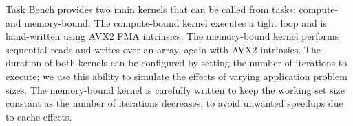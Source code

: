 



Task Bench provides two main kernels that can be called from tasks:
compute- and memory-bound. The compute-bound
kernel executes a tight loop and is hand-written using AVX2 FMA
intrinsics. The memory-bound kernel performs sequential reads and
writes over an array, again with AVX2
intrinsics. The duration of both kernels can be configured by setting
the number of iterations to execute; we use this ability to simulate
the effects of varying application problem sizes. The memory-bound
kernel is carefully written to keep the working set size constant as
the number of iterations decreases, to avoid unwanted speedups due to
cache effects.
